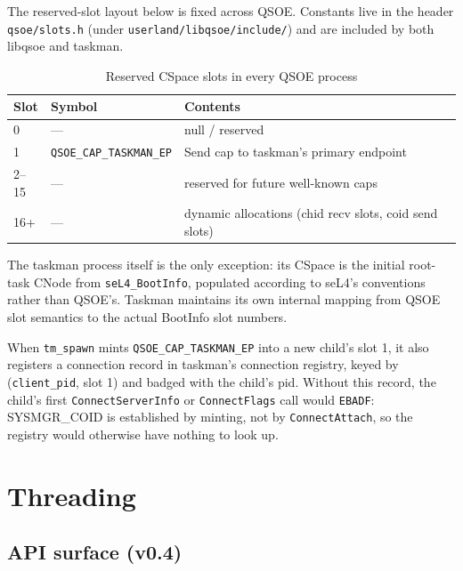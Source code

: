 The reserved-slot layout below is fixed across QSOE.  Constants live
in the header \texttt{qsoe/slots.h} (under
\texttt{userland/libqsoe/include/}) and are included by both libqsoe
and taskman.

\begin{table}[ht]
\centering
\small
\begin{tabular}{@{}lll@{}}
    \toprule
    \textbf{Slot} & \textbf{Symbol}              & \textbf{Contents} \\
    \midrule
    0    & ---                                   & null / reserved \\
    1    & \texttt{QSOE\_CAP\_TASKMAN\_EP}        & Send cap to taskman's primary endpoint \\
    2--15 & ---                                  & reserved for future well-known caps \\
    16+  & ---                                   & dynamic allocations (chid recv slots, coid send slots) \\
    \bottomrule
\end{tabular}
\caption{Reserved CSpace slots in every QSOE process}
\label{tab:cspace}
\end{table}

The taskman process itself is the only exception: its CSpace is the
initial root-task CNode from \texttt{seL4\_BootInfo}, populated
according to seL4's conventions rather than QSOE's.  Taskman maintains
its own internal mapping from QSOE slot semantics to the actual
BootInfo slot numbers.

When \texttt{tm\_spawn} mints \texttt{QSOE\_CAP\_TASKMAN\_EP} into a
new child's slot 1, it also registers a connection record in taskman's
connection registry, keyed by (\texttt{client\_pid}, slot 1)
and badged with the child's pid.  Without this record, the child's
first \texttt{ConnectServerInfo} or \texttt{ConnectFlags} call would
\texttt{EBADF}: SYSMGR\_COID is established by minting, not by
\texttt{ConnectAttach}, so the registry would otherwise have nothing
to look up.

\section{Threading}
\label{sec:threading}

\subsection{API surface (v0.4)}

